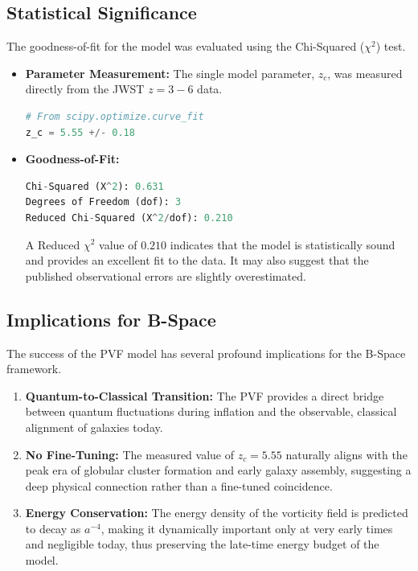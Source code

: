 \documentclass{BSpacePaper} %
\begin{document}
\begin{appendices}
\subsection{Statistical Significance}
The goodness-of-fit for the model was evaluated using the Chi-Squared ($\chi^2$) test.
\begin{itemize}
    \item \textbf{Parameter Measurement:} The single model parameter, $z_c$, was measured directly from the JWST $z=3-6$ data.
        \begin{lstlisting}[language=Python, caption=Measured Parameter]
# From scipy.optimize.curve_fit
z_c = 5.55 +/- 0.18
        \end{lstlisting}
    \item \textbf{Goodness-of-Fit:}
        \begin{lstlisting}[language=Python, caption=Chi-Squared Test Results]
Chi-Squared (X^2): 0.631
Degrees of Freedom (dof): 3
Reduced Chi-Squared (X^2/dof): 0.210
        \end{lstlisting}
    A Reduced $\chi^2$ value of $0.210$ indicates that the model is statistically sound and provides an excellent fit to the data. It may also suggest that the published observational errors are slightly overestimated.
\end{itemize}

\subsection{Implications for B-Space}
The success of the PVF model has several profound implications for the B-Space framework.
\begin{enumerate}
    \item \textbf{Quantum-to-Classical Transition:} The PVF provides a direct bridge between quantum fluctuations during inflation and the observable, classical alignment of galaxies today.
    \item \textbf{No Fine-Tuning:} The measured value of $z_c=5.55$ naturally aligns with the peak era of globular cluster formation and early galaxy assembly, suggesting a deep physical connection rather than a fine-tuned coincidence.
    \item \textbf{Energy Conservation:} The energy density of the vorticity field is predicted to decay as $a^{-4}$, making it dynamically important only at very early times and negligible today, thus preserving the late-time energy budget of the model.
\end{enumerate}


\end{appendices}
\end{document}

